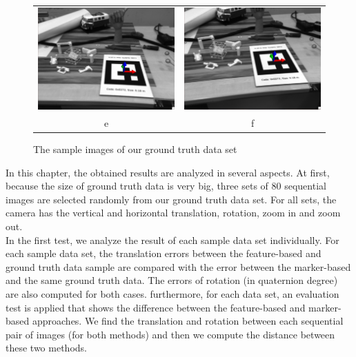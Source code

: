\begin{figure}[H]
\begin{tabular}{cc}
  \includegraphics[width=65mm]{figures/sample_4} &   \includegraphics[width=65mm]{figures/sample_5} \\
  e & f \\[6pt]
\end{tabular}
\caption{The sample images of our ground truth data set}\label{fig:sample_dataset_marker}
\end{figure}

In this chapter, the obtained results are analyzed in several aspects. At first, because the size of ground truth data is very big, three sets of 80 sequential images are selected randomly from our ground truth data set. For all sets, the camera has the vertical and horizontal translation, rotation, zoom in and zoom out. \\
In the first test, we analyze the result of each sample data set individually. For each sample data set, the translation errors between the feature-based and ground truth data sample are compared with the error between the marker-based and the same ground truth data. The errors of rotation (in quaternion degree) are also computed for both cases. furthermore, for each data set, an evaluation test is applied that shows the difference between the feature-based and marker-based approaches. We find the translation and rotation between each sequential pair of images (for both methods) and then we compute the distance between these two methods. 

